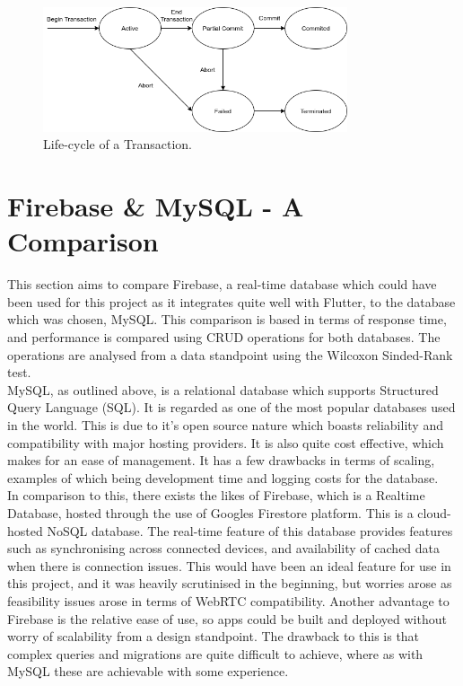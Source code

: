 \begin{figure}[h!]
    \caption{Life-cycle of a Transaction.}
    \label{image:txLifeCycle}
    \centering
    \includegraphics[width=0.8\textwidth]{images/TransactionLifeCycle_ACID.png}
\end{figure}

\section{Firebase \& MySQL - A Comparison}
This section aims to compare Firebase, a real-time database which could have been used for this project as it integrates quite well with Flutter, to the database which was chosen, MySQL. This comparison is based in terms of response time, and performance is compared using CRUD operations for both databases. The operations are analysed from a data standpoint using the Wilcoxon Sinded-Rank test.
\\ MySQL, as outlined above, is a relational database which supports Structured Query Language (SQL). It is regarded as one of the most popular databases used in the world. This is due to it’s open source nature which boasts reliability and compatibility with major hosting providers. It is also quite cost effective, which makes for an ease of management. It has a few drawbacks in terms of scaling, examples of which being development time and logging costs for the database.
\\ In comparison to this, there exists the likes of Firebase, which is a Realtime Database, hosted through the use of Googles Firestore platform. This is a cloud-hosted NoSQL database. The real-time feature of this database provides features such as synchronising across connected devices, and availability of cached data when there is connection issues. This would have been an ideal feature for use in this project, and it was heavily scrutinised in the beginning, but worries arose as feasibility issues arose in terms of WebRTC compatibility. Another advantage to Firebase is the relative ease of use, so apps could be built and deployed without worry of scalability from a design standpoint. The drawback to this is that complex queries and migrations are quite difficult to achieve, where as with MySQL these are achievable with some experience.
